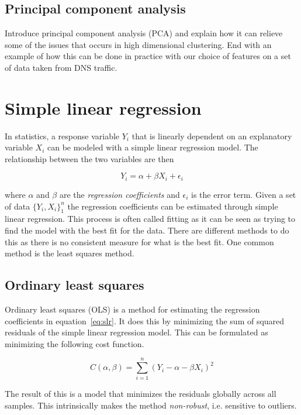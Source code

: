 \documentclass[a4paper]{report}
\begin{document}
\subsection{Principal component analysis}
Introduce principal component analysis (PCA) and explain how it can relieve
some of the issues that occurs in high dimensional clustering. End with an
example of how this can be done in practice with our choice of features on a
set of data taken from DNS traffic.

\section{Simple linear regression}
In statistics, a response variable $Y_i$ that is linearly dependent on an
explanatory variable $X_i$ can be modeled with a simple linear regression
model. The relationship between the two variables are then

\begin{equation}
    Y_i = \alpha + \beta X_i + \epsilon_i
    \label{eq:slr}
\end{equation}

where $\alpha$ and $\beta$ are the \emph{regression coefficients} and
$\epsilon_i$ is the error term. Given a set of data $\{Y_i, X_i\}_1^n$ the
regression coefficients can be estimated through simple linear regression. This
process is often called fitting as it can be seen as trying to find the model
with the best fit for the data. There are different methods to do this as there
is no consistent measure for what is the best fit. One common method is the
least squares method.

\subsection{Ordinary least squares}
Ordinary least squares (OLS) is a method for estimating the regression
coefficients in equation~\ref{eq:slr}. It does this by minimizing the sum of
squared residuals of the simple linear regression model. This can be formulated
as minimizing the following cost function.

\begin{equation}
    C(\alpha, \beta) = \sum_{i=1}^n(Y_i - \alpha - \beta X_i)^2
\end{equation}

The result of this is a model that minimizes the residuals globally across all
samples. This intrinsically makes the method \emph{non-robust}, i.e. sensitive
to outliers.
\end{document}
